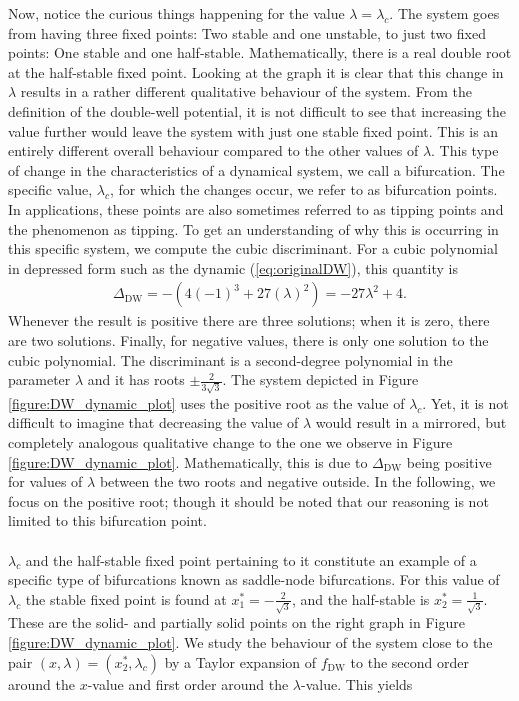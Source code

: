 Now, notice the curious things happening for the value $\lambda = \lambda_c$. The system goes from having three fixed points: Two stable and one unstable, to just two fixed points: One stable and one half-stable. Mathematically, there is a real double root at the half-stable fixed point. Looking at the graph it is clear that this change in $\lambda$ results in a rather different qualitative behaviour of the system. From the definition of the double-well potential, it is not difficult to see that increasing the value further would leave the system with just one stable fixed point. This is an entirely different overall behaviour compared to the other values of $\lambda$. This type of change in the characteristics of a dynamical system, we call a bifurcation. The specific value, $\lambda_c$, for which the changes occur, we refer to as bifurcation points.\cite{Strogatz2019_gv} In applications, these points are also sometimes referred to as tipping points and the phenomenon as tipping.
To get an understanding of why this is occurring in this specific system, we compute the cubic discriminant. For a cubic polynomial in depressed form such as the dynamic (\ref{eq:originalDW}), this quantity is
\begin{align}
    \Delta_{\mathrm{DW}} = -\left(4(-1)^3+27\left(\lambda\right)^2\right) = -27\lambda^2 + 4. \label{eq:DW_discriminant}
\end{align} 
Whenever the result is positive there are three solutions; when it is zero, there are two solutions. Finally, for negative values, there is only one solution to the cubic polynomial. The discriminant is a second-degree polynomial in the parameter $\lambda$ and it has roots $\pm \frac{2}{3\sqrt{3}}$. The system depicted in Figure \ref{figure:DW_dynamic_plot} uses the positive root as the value of $\lambda_c$. Yet, it is not difficult to imagine that decreasing the value of $\lambda$ would result in a mirrored, but completely analogous qualitative change to the one we observe in Figure \ref{figure:DW_dynamic_plot}. Mathematically, this is due to $\Delta_{\mathrm{DW}}$ being positive for values of $\lambda$ between the two roots and negative outside. In the following, we focus on the positive root; though it should be noted that our reasoning is not limited to this bifurcation point. \\\\
$\lambda_c$ and the half-stable fixed point pertaining to it constitute an example of a specific type of bifurcations known as saddle-node bifurcations. For this value of $\lambda_c$ the stable fixed point is found at $x_1^* = -\frac{2}{\sqrt{3}}$, and the half-stable is $x_2^* = \frac{1}{\sqrt{3}}$. These are the solid- and partially solid points on the right graph in Figure \ref{figure:DW_dynamic_plot}. We study the behaviour of the system close to the pair $(x, \lambda) = (x_2^*, \lambda_c)$ by a Taylor expansion of $f_{\mathrm{DW}}$ to the second order around the $x$-value and first order around the $\lambda$-value. This yields
